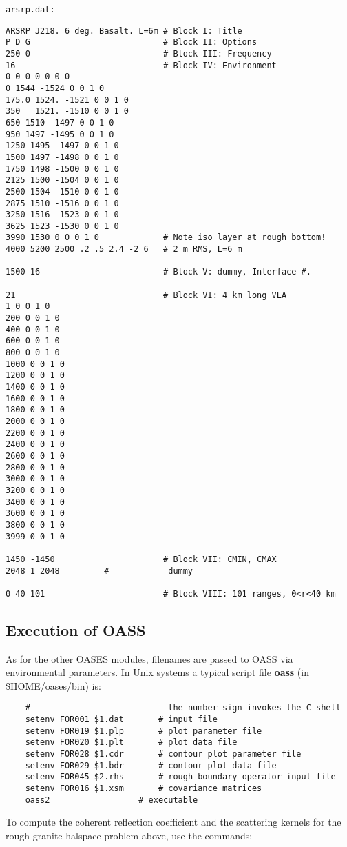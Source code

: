 \noindent \tt arsrp.dat: \rm
\small
\begin{verbatim}
ARSRP J218. 6 deg. Basalt. L=6m # Block I: Title
P D G                           # Block II: Options
250 0                           # Block III: Frequency
16                              # Block IV: Environment            
0 0 0 0 0 0 0
0 1544 -1524 0 0 1 0
175.0 1524. -1521 0 0 1 0
350   1521. -1510 0 0 1 0
650 1510 -1497 0 0 1 0
950 1497 -1495 0 0 1 0
1250 1495 -1497 0 0 1 0
1500 1497 -1498 0 0 1 0
1750 1498 -1500 0 0 1 0
2125 1500 -1504 0 0 1 0
2500 1504 -1510 0 0 1 0
2875 1510 -1516 0 0 1 0
3250 1516 -1523 0 0 1 0
3625 1523 -1530 0 0 1 0
3990 1530 0 0 0 1 0             # Note iso layer at rough bottom!
4000 5200 2500 .2 .5 2.4 -2 6   # 2 m RMS, L=6 m

1500 16                         # Block V: dummy, Interface #.

21                              # Block VI: 4 km long VLA
1 0 0 1 0
200 0 0 1 0
400 0 0 1 0
600 0 0 1 0
800 0 0 1 0
1000 0 0 1 0
1200 0 0 1 0
1400 0 0 1 0
1600 0 0 1 0
1800 0 0 1 0
2000 0 0 1 0
2200 0 0 1 0
2400 0 0 1 0
2600 0 0 1 0
2800 0 0 1 0
3000 0 0 1 0
3200 0 0 1 0
3400 0 0 1 0
3600 0 0 1 0
3800 0 0 1 0
3999 0 0 1 0

1450 -1450                      # Block VII: CMIN, CMAX
2048 1 2048			#            dummy

0 40 101                        # Block VIII: 101 ranges, 0<r<40 km
\end{verbatim}
\normalsize

\subsection{Execution of OASS}

    As  for the other OASES modules,  filenames  are  passed  to OASS   via 
environmental parameters. In Unix systems a typical script  file 
{\bf oass} (in  \$HOME/oases/bin) is:

\small
\begin{verbatim}
    #                            the number sign invokes the C-shell 
    setenv FOR001 $1.dat       # input file 
    setenv FOR019 $1.plp       # plot parameter file
    setenv FOR020 $1.plt       # plot data file  
    setenv FOR028 $1.cdr       # contour plot parameter file 
    setenv FOR029 $1.bdr       # contour plot data file 
    setenv FOR045 $2.rhs       # rough boundary operator input file
    setenv FOR016 $1.xsm       # covariance matrices
    oass2                  # executable
\end{verbatim}
\normalsize
To compute the coherent reflection coefficient and the scattering
kernels for the rough granite halspace problem above, use the
commands:


